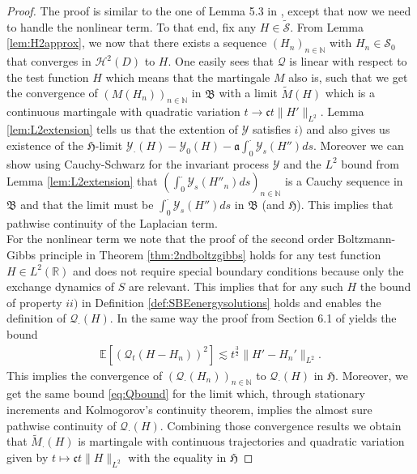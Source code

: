 \documentclass[a4paper, reqno, 12pt]{amsart}
\theoremstyle{plain}
\theoremstyle{definition}
\newcommand{\R}{\mathbb{R}}
\newcommand{\N}{\mathbb{N}}
\begin{document}
\begin{proof}
   The proof is similar to the one of  Lemma 5.3 in \cite{BGJS22}, except that  now we need to handle the nonlinear term.  
    To that end, fix any $H\in \tilde{\mathcal S}$. From  Lemma \ref{lem:H2approx}, we now that there exists  a sequence $(H_n)_{n\in\N}$ with $H_n\in\mathcal S_0$ that converges in $\mathcal H^2(D)$ to $H$.
    One easily sees that $\mathcal{Q}$ is linear with respect to the test function $H$ which means that the martingale $M$ also is, such that we get the convergence of $(M(H_n))_{n \in \mathbb N}$ in $\mathfrak{B}$ with a limit $\tilde M(H)$ which is a continuous martingale with quadratic variation $t\to \mathfrak c t\|H'\|_{L^2}$. 
    Lemma \ref{lem:L2extension} tells us that the extention of $\mathcal Y$ satisfies $i)$ and also gives us existence of the $\mathfrak H$-limit $\mathcal Y_{\cdot}(H) -\mathcal Y_0(H) - \mathfrak a\int_0^{\cdot}\mathcal Y_s(H'') ds$.
    Moreover we can show using Cauchy-Schwarz for the invariant process $\mathcal Y$ and the $L^2$ bound from Lemma \ref{lem:L2extension} that $(\int_0^{\cdot}\mathcal Y_s(H''_n) ds)_{n \in \mathbb N}$ is a Cauchy sequence in $\mathfrak B$ and that the limit must be $\int_0^{\cdot}\mathcal Y_s(H'')ds$ in  $\mathfrak B$ (and $\mathfrak H$). This implies that pathwise continuity of the Laplacian term.\\
    For the nonlinear term we note that the proof of the second order Boltzmann-Gibbs principle in Theorem \ref{thm:2ndboltzgibbs} holds for any test function $H\in L^2(\R)$ and does not require special boundary conditions because only the exchange dynamics of $S$ are relevant. This implies that for any such $H$ the bound of property $ii)$ in Definition \ref{def:SBEenergysolutions} holds and enables the definition of $\mathcal Q_{\cdot}(H)$.
    In the same way the proof from Section 6.1 of \cite{GJ14} yields the bound
    \begin{align} \label{eq:Qbound}
    \mathbb E\left[ \left(\mathcal Q_t (H-H_n)\right)^2\right] \lesssim t^{\frac{3}{2}} \|H' -H_n'\|_{L^2}.
    \end{align}
    This implies the convergence of $(\mathcal{Q}_{\cdot}(H_n))_{n \in \mathbb N}$ to $\mathcal Q_{\cdot}(H)$ in $\mathfrak H$. Moreover, we get the same bound \eqref{eq:Qbound} for the limit which, through stationary increments and Kolmogorov's continuity theorem, implies the almost sure pathwise continuity of $\mathcal Q_{\cdot}(H)$.
    Combining those convergence results we obtain that $\tilde M_{\cdot} (H)$ is martingale with continuous trajectories and quadratic variation given by $t\mapsto \mathfrak c t\|H\|_{L^2}$ with the equality in $\mathfrak H$

\end{proof}
\end{document}
